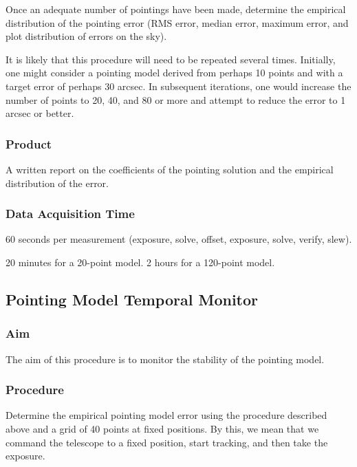 \documentclass{article}
\begin{document}
Once an adequate number of pointings have been made, determine the empirical distribution of the pointing error (RMS error, median error, maximum error, and plot distribution of errors on the sky).

It is likely that this procedure will need to be repeated several times. Initially, one might consider a pointing model derived from perhaps 10 points and with a target error of perhaps 30 arcsec. In subsequent iterations, one would increase the number of points to 20, 40, and 80 or more and attempt to reduce the error to 1 arcsec or better.

\subsubsection{Product}

A written report on the coefficients of the pointing solution and the empirical distribution of the error.

\subsubsection{Data Acquisition Time}

60 seconds per measurement (exposure, solve, offset, exposure, solve, verify, slew).

20 minutes for a 20-point model. 2 hours for a 120-point model.


\subsection{Pointing Model Temporal Monitor}

\subsubsection{Aim}

The aim of this procedure is to monitor the stability of the pointing model.

\subsubsection{Procedure}

Determine the empirical pointing model error using the procedure described above and a grid of 40 points at fixed positions. By this, we mean that we command the telescope to a fixed position, start tracking, and then take the exposure.
\end{document}
